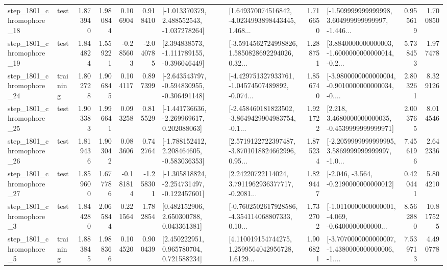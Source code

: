 \begin{tabular}{llrrrrllrlrr}
 step\_1801\_chromophore\_18 &      test &      1.873940 &    1.980844 &      0.106904 &  0.918410 &   [-1.013370379, 2.488552543, -1.037278264] &  [1.649370074516842, -4.0234993898443445, 1.468... &       1.716650 &  [-1.509999999999998, 3.604999999999997, -1.446... &            0.955619 &          1.700850 \\
 step\_1801\_chromophore\_19 &      test &      1.844824 &    1.559221 &     -0.285603 & -2.040785 &   [2.394838573, -1.111789155, -0.396046449] &  [-3.5914562724998826, 1.5850828692294026, 0.32... &       1.288751 &  [3.8840000000000003, -1.6000000000000014, -0.2... &            5.738453 &          1.977478 \\
 step\_1801\_chromophore\_24 &  training &      1.802728 &    1.906845 &      0.104117 &  0.897399 &  [-2.643543797, -0.594830955, -0.306491148] &  [-4.429751327933761, -1.04574507489892, -0.074... &       1.856740 &  [-3.9800000000000004, -0.9010000000000034, -0.... &            2.803261 &          8.329126 \\
 step\_1801\_chromophore\_25 &      test &      1.903383 &    1.996641 &      0.093258 &  0.815529 &   [-1.441736636, -2.269969617, 0.202088063] &  [-2.458460181823502, -3.8649429904983754, -0.1... &       1.921722 &   [2.218, 3.4680000000000035, -0.4539999999999971] &            2.003765 &          8.014546 \\
 step\_1801\_chromophore\_26 &      test &      1.819436 &    1.903042 &      0.083606 &  0.742764 &   [-1.788152412, 2.208464605, -0.583036353] &  [2.5719122722397487, -3.8701018824662996, 0.95... &       1.875234 &  [-2.2059999999999995, 3.5869999999999997, -1.0... &            7.456196 &          2.642336 \\
 step\_1801\_chromophore\_27 &      test &      1.859600 &    1.677786 &     -0.181814 & -1.258301 &  [-1.305818824, -2.254731497, -0.122457601] &  [2.24220722114024, 3.7911962936377717, -0.2081... &       1.829447 &              [-2.046, -3.564, -0.2190000000000012] &            0.420441 &          5.804210 \\
  step\_1801\_chromophore\_3 &      test &      1.844280 &    2.065844 &      0.221564 &  1.782854 &     [0.482152906, 2.650300788, 0.043361381] &  [-0.7602502617928586, -4.354114068807333, 0.10... &       1.732702 &  [-1.0110000000000001, -4.069, -0.6400000000000... &            8.562880 &         10.817525 \\
  step\_1801\_chromophore\_5 &  training &      1.883845 &    1.988366 &      0.104520 &  0.900439 &     [2.450222951, 0.965780704, 0.721588234] &  [4.110019154744275, 1.2599564042956728, 1.6129... &       1.906821 &  [-3.7070000000000007, -1.4380000000000006, -1.... &            7.539713 &          4.490778 \\

\end{tabular}
